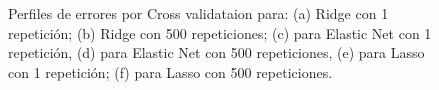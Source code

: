 \documentclass[11pt]{article}
\begin{document}
\begin{figure}
 \hfill
    \caption{Perfiles de errores por Cross validataion para: (a) Ridge con 1 repetición; (b) Ridge con 500 repeticiones; (c) para Elastic Net con 1 repetición, (d) para Elastic Net con 500 repeticiones, (e) para Lasso con 1 repetición; (f) para Lasso con 500 repeticiones.}\label{fig:MS}
\end{figure}
\printbibliography
\end{document}
